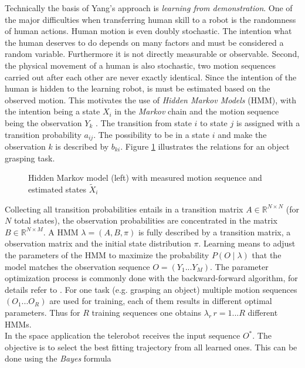 \documentclass[a4paper,twoside, openright,12pt]{report}
\begin{document}
Technically  the basis of Yang's \cite{Yang1994} approach is \emph{learning from demonstration}. One of the major difficulties when transferring human skill to a robot is the randomness of human actions. Human motion is even doubly stochastic. The intention what the human deserves to do depends on many factors and must be considered a random variable. Furthermore it is not directly measurable or observable. Second, the physical movement of a human is also stochastic, two motion sequences carried out after each other are never exactly identical. Since the intention of the human is hidden to the learning robot, is must be estimated based on the observed motion. This motivates the use of \emph{Hidden Markov Models} (HMM), with the intention being a state $X_i$ in the \emph{Markov} chain and the motion sequence being the observation $Y_k$ \cite{Yang1994}. The transition from state $i$  to state $j$ is assigned with a transition probability $a_{ij}$. The possibility to be in a state $i$ and make the observation $k$ is described by $b_{ki}$. Figure \ref{FIG:HiddenMarkov} illustrates the relations for an object grasping task.\\
\begin{figure}
	\centering
	\footnotesize
	\def\svgwidth{1\columnwidth}
	
	\caption{Hidden Markov model (left) with measured motion sequence and estimated states $\tilde{X}_i$}
	\label{FIG:HiddenMarkov}
\end{figure} 
Collecting all transition probabilities entails in a transition matrix $A \in \mathbb{R}^{N \times N}$ (for $N$ total states), the observation probabilities are concentrated in the matrix $B \in \mathbb{R}^{N \times M}$. A HMM $\lambda = (A,B,\pi)$ is fully described by a transition matrix, a observation matrix and the initial state distribution $\pi$. Learning means to adjust the parameters of the HMM to maximize the probability $P(O \mid \lambda)$ that the model matches the observation sequence $O=(Y_1...Y_M)$. The parameter optimization process is commonly done with the backward-forward algorithm, for details refer to \cite{Yang1994}. For one task (e.g. grasping an object) multiple motion sequences $(O_1...O_R)$ are used for training, each of them results in different optimal parameters. Thus for $R$ training sequences one obtains $\lambda_r \, r=1...R$ different HMMs.\\
In the space application the telerobot receives the input sequence $O^*$. The objective is to select the best fitting trajectory from all learned ones. This can be done using the \emph{Bayes} formula
\end{document}
